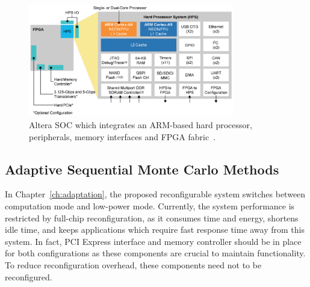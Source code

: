 \begin{figure}[t!]
\centering
\includegraphics[width=0.8\textwidth]{6_conclusion/figures/altera_soc}
\caption{Altera SOC which integrates an ARM-based hard processor, peripherals, memory interfaces and FPGA fabric~\cite{alterasoc_hps}.}
\label{fig:altera_soc}
\end{figure}



\subsection{Adaptive Sequential Monte Carlo Methods}

In Chapter~\ref{ch:adaptation}, the proposed reconfigurable system switches between computation mode and low-power mode.
Currently, the system performance is restricted by full-chip reconfiguration, 
as it consumes time and energy, shortens idle time, and keeps applications which require fast response time away from this system.
In fact, PCI Express interface and memory controller should be in place for both configurations as these components are crucial to maintain functionality.
To reduce reconfiguration overhead, these components need not to be reconfigured.

